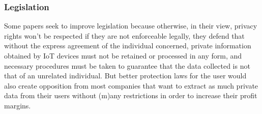 

\subsubsection{Legislation}

Some papers seek to improve legislation \cite{WEBER2015618, FabianoInternet}
because otherwise, in their view, privacy rights won't be respected if they
are not enforceable legally, they defend that without the express agreement
of the individual concerned, private information obtained by IoT devices
must not be retained or processed in any form, and necessary procedures
must be taken to guarantee that the data collected is not that of an unrelated
individual. But better protection laws for the user would also create opposition
from most companies that want to extract as much private data from their
users without (m)any restrictions in order to increase their profit margins.

